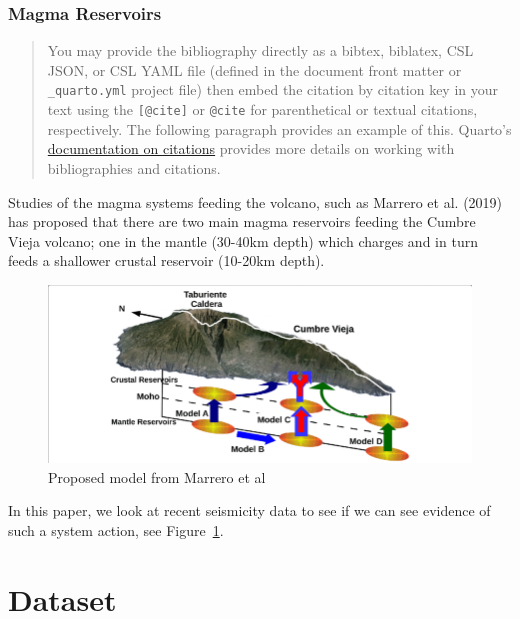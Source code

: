 \documentclass[
]{agujournal2019}
\begin{document}
\subsubsection{Magma Reservoirs}\label{magma-reservoirs}

\begin{quote}
You may provide the bibliography directly as a bibtex, biblatex, CSL
JSON, or CSL YAML file (defined in the document front matter or
\texttt{\_quarto.yml} project file) then embed the citation by citation
key in your text using the \texttt{{[}@cite{]}} or \texttt{@cite} for
parenthetical or textual citations, respectively. The following
paragraph provides an example of this. Quarto's
\href{https://quarto.org/docs/authoring/footnotes-and-citations.html}{documentation
on citations} provides more details on working with bibliographies and
citations.
\end{quote}

Studies of the magma systems feeding the volcano, such as Marrero et al.
(2019) has proposed that there are two main magma reservoirs feeding the
Cumbre Vieja volcano; one in the mantle (30-40km depth) which charges
and in turn feeds a shallower crustal reservoir (10-20km depth).

\begin{figure}

{\centering \includegraphics[width=1\textwidth,height=\textheight]{images/reservoirs.png}

}

\caption{\label{fig-reservoirs}Proposed model from Marrero et al}

\end{figure}

In this paper, we look at recent seismicity data to see if we can see
evidence of such a system action, see Figure~\ref{fig-reservoirs}.

\section{Dataset}\label{dataset}
\end{document}
